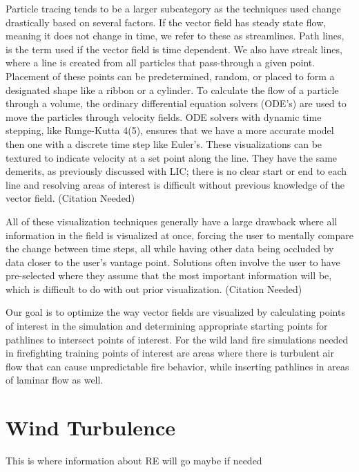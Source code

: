 Particle tracing tends to be a larger subcategory as the techniques used change drastically based on several factors. If the vector field has steady state flow, meaning it does not change in time, we refer to these as streamlines. Path lines, is the term used if the vector field is time dependent. We also have streak lines, where a line is created from all particles that pass-through a given point. Placement of these points can be predetermined, random, or placed to form a designated shape like a ribbon or a cylinder. To calculate the flow of a particle through a volume, the ordinary differential equation solvers (ODE’s) are used to move the particles through velocity fields. ODE solvers with dynamic time stepping, like Runge-Kutta 4(5), ensures that we have a more accurate model then one with a discrete time step like Euler’s. These visualizations can be textured to indicate velocity at a set point along the line. They have the same demerits, as previously discussed with LIC; there is no clear start or end to each line and resolving areas of interest is difficult without previous knowledge of the vector field. (Citation Needed) 
\par
All of these visualization techniques  generally have a large drawback where all information in the field is visualized at once, forcing the user to  mentally compare the change  between time steps, all while having other data being occluded by data closer to the user’s vantage point. Solutions often involve the user to have pre-selected where they assume that the most important information will be, which is difficult to do with out prior visualization. (Citation Needed) 


Our goal is to optimize the way vector fields are visualized by calculating points of interest in the simulation and determining appropriate starting points for pathlines to intersect points of interest. For the wild land fire simulations needed in firefighting training points of interest are areas where there is turbulent air flow that can cause unpredictable fire behavior, while inserting pathlines in areas of laminar flow as well.


\section{Wind Turbulence}

This is where information about RE will go maybe if needed





